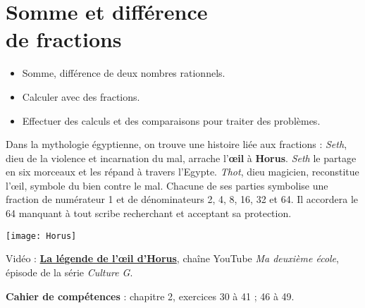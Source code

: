 \themaN
\graphicspath{{../../S26_Somme_et_difference_de_fractions/Images/}}

\chapter{Somme et différence\\de fractions}
\label{S26}



\begin{prerequis}
   \begin{itemize}
      \item Somme, différence de deux nombres rationnels.
      \item[\com] Calculer avec des fractions.
      \item[\com] Effectuer des calculs et des comparaisons pour traiter des problèmes.
   \end{itemize}
\end{prerequis}

\vfill

\begin{debat} 
   Dans la mythologie égyptienne, on trouve une histoire liée aux fractions : {\it Seth}, dieu de la violence et incarnation du mal, arrache l’{\bf œil} à {\bf Horus}. {\it Seth} le partage en six morceaux et les répand à travers l’Egypte. {\it Thot}, dieu magicien, reconstitue l’œil, symbole du bien contre le mal. Chacune de ses parties symbolise une fraction de numérateur 1 et de dénominateurs 2, 4, 8, 16, 32 et 64. Il accordera le 64 manquant à tout scribe recherchant et acceptant sa protection.
   \begin{center}
      \texttt{[image: Horus]}
   \end{center}
   \bigskip
   \begin{cadre}[B2][F4]
      \begin{center}
         Vidéo : \href{https://www.youtube.com/watch?v=yHft4m1Gi7k}{\bf La légende de l'\oe il d'Horus}, chaîne YouTube {\it Ma deuxième école}, épisode de la série {\it Culture G}.
      \end{center}
   \end{cadre}
\end{debat}

\vfill

\textcolor{PartieGeometrie}{\sffamily\bfseries Cahier de compétences} : chapitre 2, exercices 30 à 41 ; 46 à 49.


